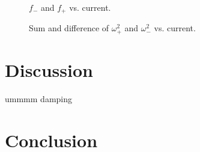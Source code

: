 \documentclass{article}
\begin{document}
\begin{figure}
		\centering
		\def\svgwidth{\linewidth}
		
		\caption{$f_-$ and $f_+$ vs. current.}
		\label{fig:fvsi}
\end{figure}

\begin{figure}
	\centering
	\begin{subfigure}{.5\linewidth}
		\def\svgwidth{\linewidth}
		
	\end{subfigure}%
	\begin{subfigure}{.5\linewidth}
		\def\svgwidth{\linewidth}
		
	\end{subfigure}
	\caption{Sum and difference of $\omega_+^2$ and $\omega_-^2$ vs. current.}
	\label{fig:omegagraphs}
\end{figure}


\section{Discussion}

ummmm damping

\section{Conclusion}
\end{document}
